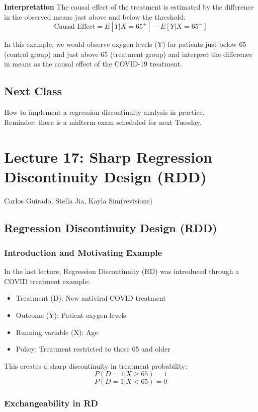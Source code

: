 \textbf{Interpretation}
The causal effect of the treatment is estimated by the difference in the observed means just above and below the threshold:
$$\text{Causal Effect} = E[Y | X = 65^+] - E[Y | X = 65^-]$$

In this example, we would observe oxygen levels (Y) for patients just below 65 (control group) and just above 65 (treatment group) and interpret the difference in means as the causal effect of the COVID-19 treatment.

\subsection*{Next Class}
How to implement a regression discontinuity analysis in practice. \\
Reminder: there is a midterm exam scheduled for next Tuesday.

\section{Lecture 17: Sharp Regression Discontinuity Design (RDD)}{Carlos Guirado, Stella Jia, Kayla Sim(revisions)}

\subsection{Regression Discontinuity Design (RDD)}

\subsubsection{Introduction and Motivating Example}

In the last lecture, Regression Discontinuity (RD) was introduced through a COVID treatment example:
\begin{itemize}
    \item Treatment (D): New antiviral COVID treatment
    \item Outcome (Y): Patient oxygen levels
    \item Running variable (X): Age
    \item Policy: Treatment restricted to those 65 and older
\end{itemize}

This creates a sharp discontinuity in treatment probability:
\[P(D=1|X \geq 65) = 1\]
\[P(D=1|X < 65) = 0\]

\subsubsection{Exchangeability in RD}

